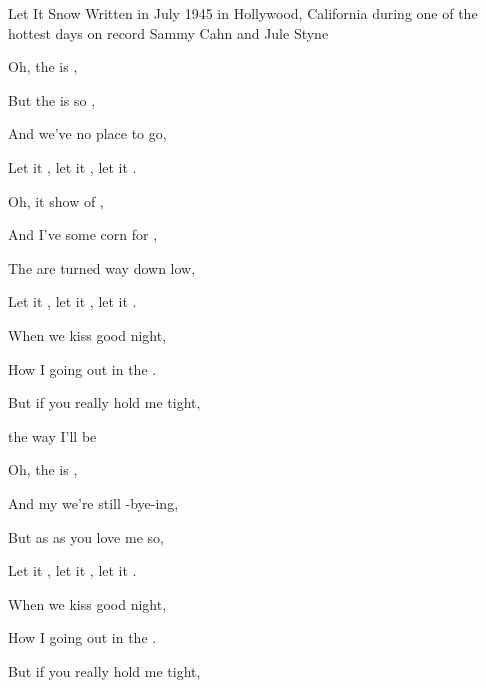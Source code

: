 \begin{SBSong}{Let It Snow}
    {Written in July 1945 in Hollywood, California during one of the hottest days on record}
    {Sammy Cahn and Jule Styne}
  \begin{SBVerse}
     Oh, the   is ,
    
    But the  is so ,
    
    And  we've no place to go,
    
    Let it , let it , let it .
  \end{SBVerse}
  \begin{SBVerse}
    Oh, it  show  of ,
    
    And I've  some corn for ,
    
    The  are turned way down low,
    
    Let it , let it , let it .
  \end{SBVerse}
  \begin{SBVerse}
    When we  kiss good night,
    
    How I  going out in the .
    
    But if you really hold me tight,
    
     the way  I'll be  
  \end{SBVerse}
  
  \begin{SBVerse}
    Oh, the  is  ,
    
    And my  we're still -bye-ing,
    
    But as  as you love me so,
    
    Let it , let it , let it .
  \end{SBVerse}
  \begin{SBVerse}
    When we  kiss good night,
    
    How I  going out in the .
    
    But if you really hold me tight,
    

\end{SBVerse}
\end{SBSong}
